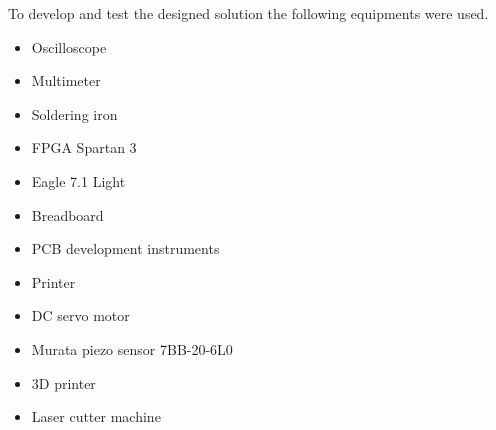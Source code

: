 To develop and test the designed solution the following equipments were used.
\begin{itemize}
	\item Oscilloscope
	\item Multimeter
	\item Soldering iron
	\item FPGA Spartan 3
	\item Eagle 7.1 Light
	\item Breadboard
	\item PCB development instruments
	\item Printer
	\item DC servo motor
	\item Murata piezo sensor 7BB-20-6L0
	\item 3D printer
	\item Laser cutter machine
\end{itemize}
